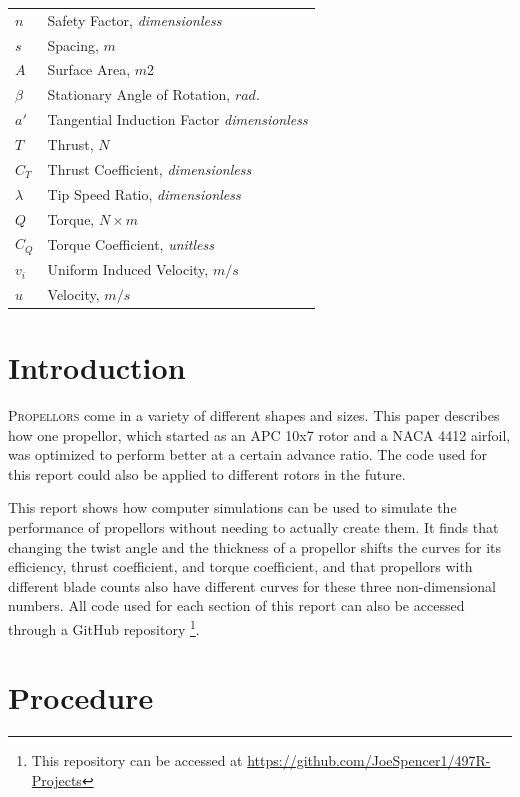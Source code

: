 \documentclass[journal ]{new-aiaa}
\begin{document}
{\begin{longtable*}{@{}l @{\quad=\quad} l@{}}
$n$ & Safety Factor, \emph{dimensionless} \\
$s$ & Spacing, $m$ \\
$A$ & Surface Area, $m${2} \\
$\beta$ & Stationary Angle of Rotation, $rad.$ \\
$a'$ & Tangential Induction Factor \emph{dimensionless} \\
$T$ & Thrust, $N$ \\
$C_{T}$ & Thrust Coefficient, \emph{dimensionless} \\
$\lambda$ & Tip Speed Ratio, \emph{dimensionless} \\
$Q$ & Torque, $N \times m$ \\
$C_{Q}$ & Torque Coefficient, \emph{unitless} \\
$v_{i}$ & Uniform Induced Velocity, $m/s$ \\
$u$ & Velocity, $m/s$ \\

\end{longtable*}}


\section{Introduction}

\lettrine{P}{ropellors} come in a variety of different shapes and sizes. This paper describes how one propellor, which started as an APC 10x7 rotor and a NACA 4412 airfoil, was optimized to perform better at a certain advance ratio. The code used for this report could also be applied to different rotors in the future.

This report shows how computer simulations can be used to simulate the performance of propellors without needing to actually create them. It finds that changing the twist angle and the thickness of a propellor shifts the curves for its efficiency, thrust coefficient, and torque coefficient, and that propellors with different blade counts also have different curves for these three non-dimensional numbers. All code used for each section of this report can also be accessed through a GitHub repository \footnote{This repository can be accessed at \url{https://github.com/JoeSpencer1/497R-Projects}}.


\section{Procedure}
\end{document}
